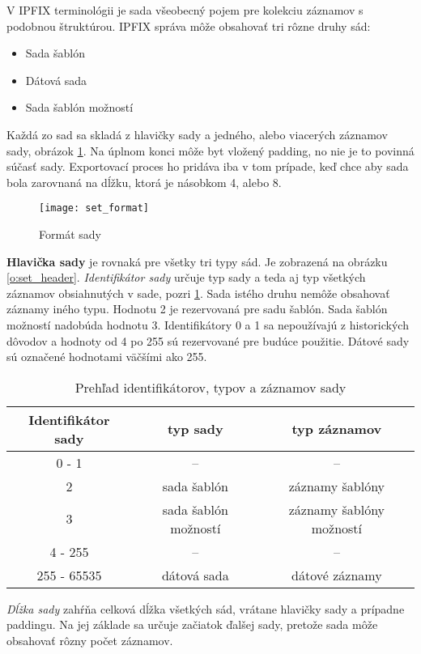 V IPFIX terminológii je sada všeobecný pojem pre kolekciu záznamov s podobnou štruktúrou. 
IPFIX správa môže obsahovať tri rôzne druhy sád:
\begin{itemize}
 \item Sada šablón
 \item Dátová sada
 \item Sada šablón možností
\end{itemize}
Každá zo sad sa skladá z hlavičky sady a jedného, alebo viacerých záznamov sady, obrázok \ref{o:set_format}. 
Na úplnom konci môže byt vložený padding, no nie je to povinná súčasť sady. Exportovací proces ho pridáva 
iba v tom prípade, keď chce aby sada bola zarovnaná na dĺžku, ktorá je násobkom 4, alebo 8.

\begin{figure}[ht!]
\centering
\texttt{[image: set\_format]}
\caption{Formát sady}\label{o:set_format}
\end{figure}

\textbf{Hlavička sady} je rovnaká pre všetky tri typy sád. Je zobrazená na obrázku \ref{o:set_header}. 
\emph{Identifikátor sady} určuje typ sady a teda aj typ všetkých záznamov obsiahnutých v sade, pozri 
\ref{t:set-record}. 
Sada istého druhu nemôže obsahovať záznamy iného typu. 
Hodnotu 2 je rezervovaná pre sadu šablón. Sada šablón možností nadobúda 
hodnotu 3. Identifikátory 0 a 1 sa nepoužívajú z historických dôvodov \citep{rfc3954} a hodnoty od 4 po 
255 sú rezervované pre budúce použitie. Dátové sady sú označené hodnotami väčšími ako 255. 

\tabcolsep=8pt
\begin{table}[!ht]\caption{Prehľad identifikátorov, typov a záznamov sady}\label{t:set-record}
\smallskip
\centering
\begin{tabular}{|c|c|c|}
\hline
\textbf{Identifikátor sady} & \textbf{typ sady} & \textbf{typ záznamov} \\ \hline
0 - 1 & -- & -- \\ \hline
2 & sada šablón & záznamy šablóny \\ \hline
3 & sada šablón možností & záznamy šablóny možností \\ \hline
4 - 255 & -- & -- \\ \hline
255 - 65535 & dátová sada & dátové záznamy \\ \hline
\end{tabular}
\end{table}

\emph{Dĺžka sady} zahŕňa celková dĺžka všetkých sád, vrátane hlavičky sady a prípadne paddingu. Na jej základe 
sa určuje začiatok ďalšej sady, pretože sada môže obsahovať rôzny počet záznamov.

